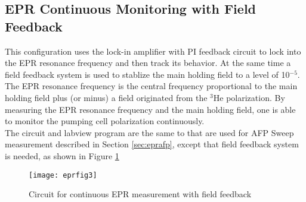 \subsection{EPR Continuous Monitoring with Field Feedback}  
  
This configuration uses the lock-in amplifier with PI feedback 
circuit to lock into the EPR resonance frequency and then track its
behavior. At the same time a field feedback system is used to stablize the
main holding field to a level of 10$^{-5}$.  The EPR resonance frequency is the central
frequency proportional to the main holding field plus (or minus) a field originated
from the $^3$He polarization.  By measuring the EPR resonance frequency and
the main holding field, one is able to monitor the pumping cell polarization continuously.\\


The circuit and labview program are the same to that are used for AFP Sweep 
measurement described in Section \ref{sec:eprafp}, except that field feedback system 
is needed, as shown in Figure \ref{fig3:epr}

\begin{figure}
\begin{center}
\centerline{ \texttt{[image: eprfig3]}}
\caption{Circuit for continuous EPR measurement with field feedback}
\end{center}
\label{fig3:epr}
\end{figure}



